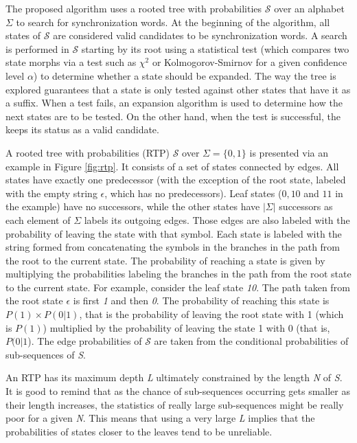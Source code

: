 {The proposed algorithm uses a rooted tree with probabilities $\mathcal{S}$ over an alphabet $\Sigma$ to search for synchronization words. At the beginning of the algorithm, all states of $\mathcal{S}$ are considered valid candidates to be synchronization words. A search is performed in $\mathcal{S}$ starting by its root using a statistical test (which compares two state morphs via a test such as $\chi^2$ or Kolmogorov-Smirnov for a given confidence level $\alpha$) to determine whether a state should be expanded. The way the tree is explored guarantees that a state is only tested against other states that have it as a suffix. When a test fails, an expansion algorithm is used to determine how the next states are to be tested. On the other hand, when the test is successful, the keeps its status as a valid candidate.

A rooted tree with probabilities (RTP) $\mathcal{S}$ over $\Sigma = \{0, 1\}$ is presented via an example in Figure \ref{fig:rtp}. It consists of a set of states connected by edges. All states have exactly one predecessor (with the exception of the root state, labeled with the empty string $\epsilon$, which has no predecessors). Leaf states ($0, 10$ and $11$ in the example) have no successors, while the other states have $|\Sigma|$ successors as each element of $\Sigma$ labels its outgoing edges. Those edges are also labeled with the probability of leaving the state with that symbol. Each state is labeled with the string formed from concatenating the symbols in the branches in the path from the root to the current state. The probability of reaching a state is given by multiplying the probabilities labeling the branches in the path from the root state to the current state. For example, consider the leaf state \textit{10}. The path taken from the root state $\epsilon$ is first \textit{1} and then \textit{0}. The probability of reaching this state is $P(1)\times P(0|1)$, that is the probability of leaving the root state with 1 (which is $P(1)$) multiplied by the probability of leaving the state 1 with 0 (that is, $P(0|1$). The edge probabilities of $\mathcal{S}$ are taken from the conditional probabilities of sub-sequences of \textit{S}.

An RTP has its maximum depth \textit{L} ultimately constrained by the length \textit{N} of \textit{S}. It is good to remind that as the chance of sub-sequences occurring gets smaller as their length increases, the statistics of really large sub-sequences might be really poor for a given \textit{N}. This means that using a very large \textit{L} implies that the probabilities of states closer to the leaves tend to be unreliable.

}
